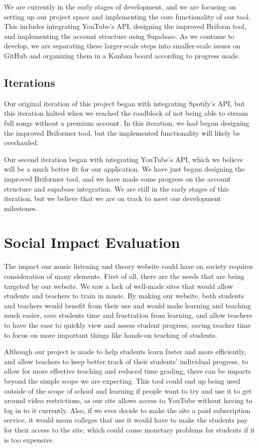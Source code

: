 \documentclass[12pt, letterpaper]{article}
\begin{document}
We are currently in the early stages of development, and we are focusing on setting up our project space and implementing the core functionality of our tool.  This includes integrating YouTube's API, designing the improved Briform tool, and implementing the account structure using Supabase.  As we continue to develop, we are separating these larger-scale steps into smaller-scale issues on GitHub and organizing them in a Kanban board according to progress made.

\subsection*{Iterations}

Our original iteration of this project began with integrating Spotify's API, but this iteration halted when we reached the roadblock of not being able to stream full songs without a premium account.  In this iteration, we had begun designing the improved Briformer tool, but the implemented functionality will likely be overhauled.

Our second iteration began with integrating YouTube's API, which we believe will be a much better fit for our application.  We have just begun designing the improved Briformer tool, and we have made some progress on the account structure and supabase integration.  We are still in the early stages of this iteration, but we believe that we are on track to meet our development milestones.

\section*{Social Impact Evaluation}
The impact our music listening and theory website could have on society requires consideration of many elements. First of all, there are the needs that are being targeted by our website. We saw a lack of well-made sites that would allow students and teachers to train in music. By making our website, both students and teachers would benefit from their use and would make learning and teaching much easier, save students time and frustration from learning, and allow teachers to have the ease to quickly view and assess student progress, saving teacher time to focus on more important things like hands-on teaching of students.

Although our project is made to help students learn faster and more efficiently, and allow teachers to keep better track of their students' individual progress, to allow for more effective teaching and reduced time grading, there can be impacts beyond the simple scope we are expecting. This tool could end up being used outside of the scope of school and learning if people want to try and use it to get around video restrictions, as our site allows access to YouTube without having to log in to it currently. Also, if we ever decide to make the site a paid subscription service, it would mean colleges that use it would have to make the students pay for their access to the site, which could cause monetary problems for students if it is too expensive.
\end{document}
